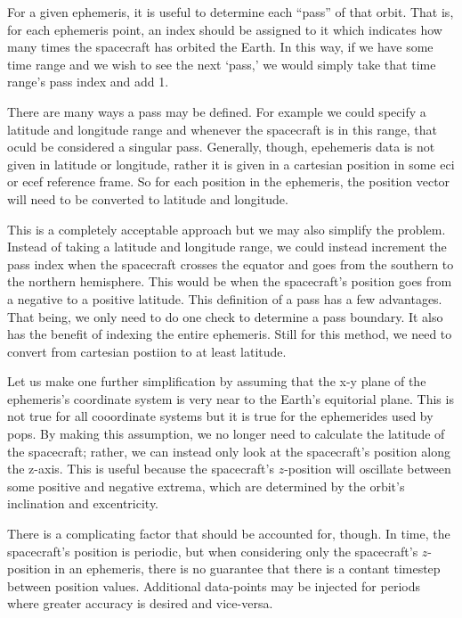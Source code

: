 For a given ephemeris, it is useful to determine each ``pass'' of that orbit.
That is, for each ephemeris point, an index should be assigned to it which
indicates how many times the spacecraft has orbited the Earth. In this way, if
we have some time range and we wish to see the next `pass,' we would simply
take that time range's pass index and add 1.

There are many ways a pass may be defined. For example we could specify a
latitude and longitude range and whenever the spacecraft is in this range, that
oculd be considered a singular pass.  Generally, though, epehemeris data is not
given in latitude or longitude, rather it is given in a cartesian position in
some \gls{eci} or \gls{ecef} reference frame.  So for each position in the
ephemeris, the position vector will need to be converted to latitude and
longitude. 

This is a completely acceptable approach but we may also simplify the problem.
Instead of taking a latitude and longitude range, we could instead increment
the pass index when the spacecraft crosses the equator and goes from the
southern to the northern hemisphere. This would be when the spacecraft's
position goes from a negative to a positive latitude. This definition of a pass
has a few advantages. That being, we only need to do one check to determine a
pass boundary. It also has the benefit of indexing the entire ephemeris. Still
for this method, we need to convert from cartesian postiion to at least
latitude.

Let us make one further simplification by assuming that the x-y plane of the
ephemeris's coordinate system is very near to the Earth's equitorial plane.
This is not true for all cooordinate systems but it is true for the ephemerides
used by \gls{pops}. By making this assumption, we no longer need to calculate
the latitude of the spacecraft; rather, we can instead only look at the
spacecraft's position along the z-axis. This is useful because the spacecraft's
$z$-position will oscillate between some positive and negative extrema, which
are determined by the orbit's inclination and excentricity. 

There is a complicating factor that should be accounted for, though. In time,
the spacecraft's position is periodic, but when considering only the
spacecraft's $z$-position in an ephemeris, there is no guarantee that there is
a contant timestep between position values. Additional data-points may be
injected for periods where greater accuracy is desired and vice-versa.  

